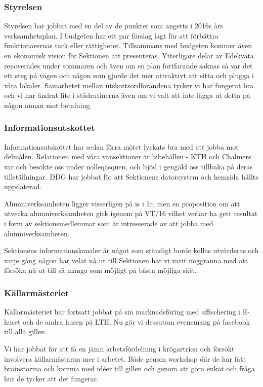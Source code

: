 \documentclass[../_main/handlingar.tex]{subfiles}
\begin{document}

\subsubsection*{Styrelsen}
Styrelsen har jobbat med en del av de punkter som angetts i 2016s års verksamhetsplan. I budgeten har ett par förslag lagt för att förbättra funktionärernas tack eller rättigheter. Tillsammans med budgeten kommer även en ekonomisk vision för Sektionen att presenteras. Ytterligare delar av Edekvata renoverades under sommaren och även om en plan fortfarande saknas så var det ett steg på vägen och någon som gjorde det mer attraktivt att sitta och plugga i våra lokaler.  Samarbetet mellan utskottsordförandena tycker vi har fungerat bra och vi har ändrat lite i städrutinerna även om vi valt att inte lägga ut detta på någon annan mot betalning.

\subsubsection*{Informationsutskottet}
Informationsutskottet har sedan förra mötet lyckats bra med att jobba mot delmålen. Relationen med våra vänsektioner är bibehållen - KTH och Chalmers var och besökte oss under nolleqasquen, och bjöd i gengäld oss tillbaka på deras tillställningar. DDG har jobbat för att Sektionens datorsystem och hemsida hållts uppdaterad.

Alumniverksamheten ligger visserligen på is i år, men en proposition om att utvecka alumniverksamheten gick igenom på VT/16 vilket verkar ha gett resultat i form av sektionsmedlemmar som är intresserade av att jobba med alumniverksamheten.

Sektionens informationskanaler är något som ständigt borde kollas utvärderas och varje gång någon har velat nå ut till Sektionen har vi varit noggranna med att försöka nå ut till så många som möjligt på bästa möjliga sätt.

\subsubsection*{Källarmästeriet}
Källarmästeriet har fortsatt jobbat på sin marknadsföring med affischering i E-huset och de andra husen på LTH. Nu gör vi dessutom evenemang på facebook till alla gillen.

Vi har jobbat för att få en jämn arbetsfördelning i krögartrion och försökt involvera källarmästarna mer i arbetet. Både genom workshop där de har fått brainstorma och komma med idéer till gillen och genom att göra enkät och fråga hur de tycker att det fungerar.
\end{document}
